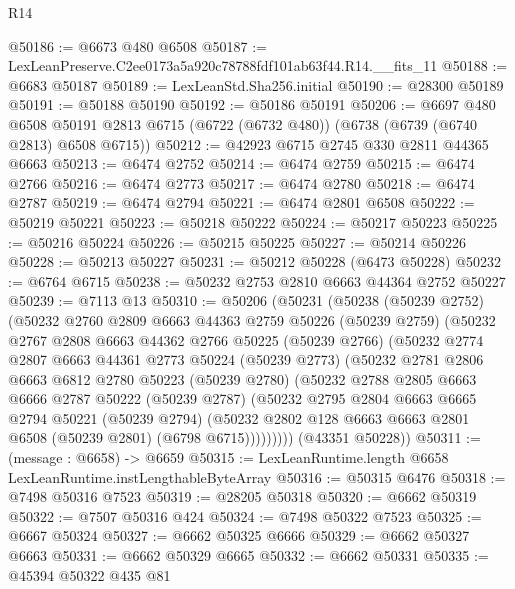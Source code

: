 \begin{lexlean}{R14}
\begin{coremodule}
@50186 := @6673 @480 @6508
@50187 := LexLeanPreserve.C2ee0173a5a920c78788fdf101ab63f44.R14.__fits_11
@50188 := @6683 @50187
@50189 := LexLeanStd.Sha256.initial
@50190 := @28300 @50189
@50191 := @50188 @50190
@50192 := @50186 @50191
@50206 := @6697
    @480
    @6508
    @50191
    @2813
    @6715
    (@6722 (@6732 @480))
    (@6738 (@6739 (@6740 @2813) @6508 @6715))
@50212 := @42923 @6715 @2745 @330 @2811 @44365 @6663
@50213 := @6474 @2752
@50214 := @6474 @2759
@50215 := @6474 @2766
@50216 := @6474 @2773
@50217 := @6474 @2780
@50218 := @6474 @2787
@50219 := @6474 @2794
@50221 := @6474 @2801 @6508
@50222 := @50219 @50221
@50223 := @50218 @50222
@50224 := @50217 @50223
@50225 := @50216 @50224
@50226 := @50215 @50225
@50227 := @50214 @50226
@50228 := @50213 @50227
@50231 := @50212 @50228 (@6473 @50228)
@50232 := @6764 @6715
@50238 := @50232 @2753 @2810 @6663 @44364 @2752 @50227
@50239 := @7113 @13
@50310 := @50206
    (@50231
      (@50238
        (@50239 @2752)
        (@50232
          @2760
          @2809
          @6663
          @44363
          @2759
          @50226
          (@50239 @2759)
          (@50232
            @2767
            @2808
            @6663
            @44362
            @2766
            @50225
            (@50239 @2766)
            (@50232
              @2774
              @2807
              @6663
              @44361
              @2773
              @50224
              (@50239 @2773)
              (@50232
                @2781
                @2806
                @6663
                @6812
                @2780
                @50223
                (@50239 @2780)
                (@50232
                  @2788
                  @2805
                  @6663
                  @6666
                  @2787
                  @50222
                  (@50239 @2787)
                  (@50232
                    @2795
                    @2804
                    @6663
                    @6665
                    @2794
                    @50221
                    (@50239 @2794)
                    (@50232 @2802 @128 @6663 @6663 @2801 @6508 (@50239 @2801) (@6798 @6715)))))))))
      (@43351 @50228))
@50311 := (message : @6658) -> @6659
@50315 := LexLeanRuntime.length @6658 LexLeanRuntime.instLengthableByteArray
@50316 := @50315 @6476
@50318 := @7498 @50316 @7523
@50319 := @28205 @50318
@50320 := @6662 @50319
@50322 := @7507 @50316 @424
@50324 := @7498 @50322 @7523
@50325 := @6667 @50324
@50327 := @6662 @50325 @6666
@50329 := @6662 @50327 @6663
@50331 := @6662 @50329 @6665
@50332 := @6662 @50331
@50335 := @45394 @50322 @435 @81

\end{coremodule}
\end{lexlean}
